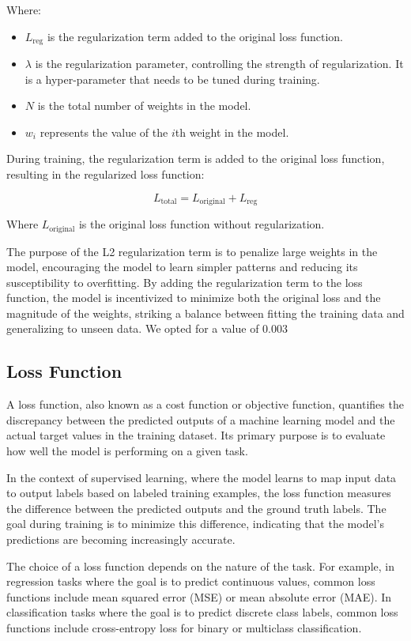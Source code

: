 \documentclass[a4paper]{report}
\begin{document}
{Where:

\begin{itemize}
    \item \( L_{\text{reg}} \) is the regularization term added to the original loss function.
    \item \( \lambda \) is the regularization parameter, controlling the strength of regularization. It is a hyper-parameter that needs to be tuned during training.
    \item \( N \) is the total number of weights in the model.
    \item \( w_i \) represents the value of the \( i \)th weight in the model.
\end{itemize}

During training, the regularization term is added to the original loss function, resulting in the regularized loss function:

\[
L_{\text{total}} = L_{\text{original}} + L_{\text{reg}}
\]

Where \( L_{\text{original}} \) is the original loss function without regularization.

The purpose of the L2 regularization term is to penalize large weights in the model, encouraging the model to learn simpler patterns and reducing its susceptibility to overfitting. By adding the regularization term to the loss function, the model is incentivized to minimize both the original loss and the magnitude of the weights, striking a balance between fitting the training data and generalizing to unseen data. We opted for a value of $0.003$
\subsection{Loss Function}
A loss function, also known as a cost function or objective function, quantifies the discrepancy between the predicted outputs of a machine learning model and the actual target values in the training dataset. Its primary purpose is to evaluate how well the model is performing on a given task.

In the context of supervised learning, where the model learns to map input data to output labels based on labeled training examples, the loss function measures the difference between the predicted outputs and the ground truth labels. The goal during training is to minimize this difference, indicating that the model's predictions are becoming increasingly accurate.

The choice of a loss function depends on the nature of the task. For example, in regression tasks where the goal is to predict continuous values, common loss functions include mean squared error (MSE) or mean absolute error (MAE). In classification tasks where the goal is to predict discrete class labels, common loss functions include cross-entropy loss for binary or multiclass classification.

}
\end{document}

